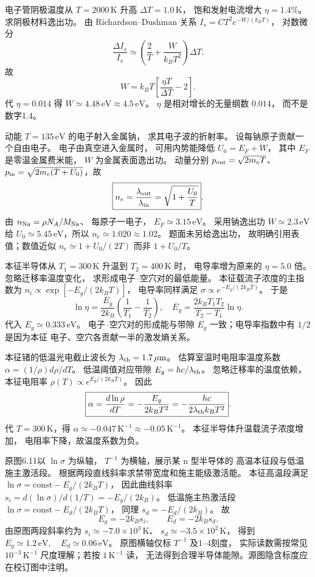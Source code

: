 电子管阴极温度从 $T=2000\,\mathrm K$
升高 $\Delta T=1.0\,\mathrm K$，
饱和发射电流增大 $\eta=1.4\%$。
求阴极材料逸出功。
\exsolution
由 Richardson--Dushman 关系
$I_s=C T^2e^{-W/(k_BT)}$，
对数微分
\[
 \frac{\Delta I_s}{I_s}\simeq
 \left(\frac2T+\frac W{k_BT^2}\right)\Delta T.
\]
故
\[
 \boxed{W=k_BT\left[
 \frac{\eta T}{\Delta T}-2\right]}.
\]
代 $\eta=0.014$ 得
$\boxed{W\simeq4.48\,\mathrm{eV}\approx4.5\,\mathrm{eV}}$。
\excheck $\eta$ 是相对增长的无量纲数 $0.014$，
而不是数字1.4。

动能 $T=135\,\mathrm{eV}$ 的电子射入金属钠，
求其电子波的折射率。
设每钠原子贡献一个自由电子。
\exsolution
电子由真空进入金属时，
可用内势能降低 $U_0=E_F+W$，
其中 $E_F$ 是零温金属费米能，
$W$ 为金属表面逸出功。
动量分别
$p_{\rm out}=\sqrt{2m_eT}$、
$p_{\rm in}=\sqrt{2m_e(T+U_0)}$，故
\[
 \boxed{n_e=\frac{\lambda_{\rm out}}{\lambda_{\rm in}}
 =\sqrt{1+\frac{U_0}{T}}}.
\]
由 $n_{\rm Na}=\rho N_A/M_{\rm Na}$、
每原子一电子，
$E_F\simeq3.15\,\mathrm{eV}$。
采用钠逸出功 $W\simeq2.3\,\mathrm{eV}$
给 $U_0\simeq5.45\,\mathrm{eV}$，所以
$\boxed{n_e\simeq1.020\approx1.02}$。
\excheck 题面未另给逸出功，
故明确引用表值；数值近似
$n_e\simeq1+U_0/(2T)$ 而非 $1+U_0/T$。

本征半导体从 $T_1=300\,\mathrm K$
升温到 $T_2=400\,\mathrm K$ 时，
电导率增为原来的 $\eta=5.0$ 倍。
忽略迁移率温度变化，
求形成电子--空穴对的最低能量。
\exsolution
本征载流子浓度的主指数为
$n_i\propto\exp[-E_g/(2k_BT)]$，
电导率同样满足
$\sigma\propto e^{-E_g/(2k_BT)}$。
于是
\[
 \ln\eta=\frac{E_g}{2k_B}
 \left(\frac1{T_1}-\frac1{T_2}\right),
\quad
 \boxed{E_g=\frac{2k_BT_1T_2}{T_2-T_1}\ln\eta}.
\]
代入
$\boxed{E_g\simeq0.333\,\mathrm{eV}}$。
\excheck 电子--空穴对的形成能与带隙 $E_g$
一致；电导率指数中有 $1/2$ 是因为本征
电子、空穴各贡献一半的激发熵关系。

本征锗的低温光电截止波长为
$\lambda_{\rm th}=1.7\,\mu\mathrm m$。
估算室温时电阻率温度系数
$\alpha=(1/\rho)d\rho/dT$。
\exsolution
低温阈值对应带隙
$E_g=hc/\lambda_{\rm th}$。
忽略迁移率的温度依赖，
本征电阻率
$\rho(T)\propto e^{E_g/(2k_BT)}$。
因此
\[
 \boxed{\alpha=\frac{d\ln\rho}{dT}
 =-\frac{E_g}{2k_BT^2}
 =-\frac{hc}{2\lambda_{\rm th}k_BT^2}}.
\]
代 $T=300\,\mathrm K$，得
$\boxed{\alpha\simeq-0.047\,\mathrm{K^{-1}}
 \approx-0.05\,\mathrm{K^{-1}}}$。
\excheck 本征半导体升温载流子浓度增加，
电阻率下降，故温度系数为负。

原图6.11以 $\ln\sigma$ 为纵轴，
$T^{-1}$ 为横轴，展示某 n 型半导体的
高温本征段与低温施主激活段。
根据两段直线斜率求禁带宽度和施主能级激活能。
\exsolution
本征高温段满足
$\ln\sigma=\mathrm{const}-E_g/(2k_BT)$，
因此曲线斜率
$s_i=d(\ln\sigma)/d(1/T)=-E_g/(2k_B)$。
低温施主热激活段
$\ln\sigma=\mathrm{const}-E_d/(2k_BT)$，
同理 $s_d=-E_d/(2k_B)$。
故
\[
 \boxed{E_g=-2k_Bs_i},\qquad
 \boxed{E_d=-2k_Bs_d}.
\]
由原图两段斜率约为
$s_i\simeq-7.0\times10^3\,\mathrm K$、
$s_d\simeq-3.5\times10^2\,\mathrm K$，
得到
$\boxed{E_g\simeq1.2\,\mathrm{eV},\quad
 E_d\simeq0.06\,\mathrm{eV}}$。
\excheck 原图横轴仅标 $T^{-1}$ 及1--4刻度，
实际读数需按常见 $10^{-3}\,\mathrm{K^{-1}}$
尺度理解；若按 $1\,\mathrm{K^{-1}}$ 读，
无法得到合理半导体能隙。源图隐含标度应在校订图中注明。

